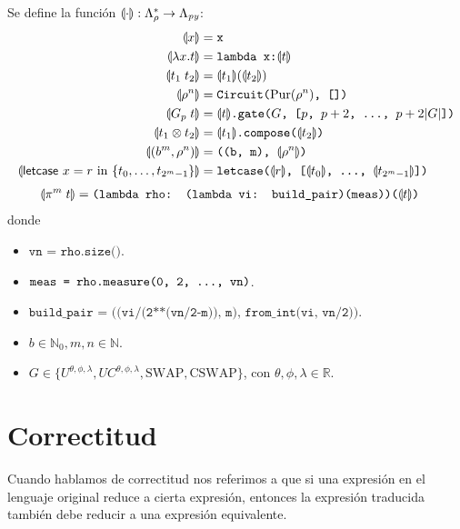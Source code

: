 \begin{definicion}
\label{def:traduccion}$\;$

Se define la función $\llparenthesis \cdot \rrparenthesis : \Lambda_\rho^* \rightarrow \Lambda_\textit{py}$:
\begin{align*}
\llparenthesis x \rrparenthesis &= \texttt{x} \\
\llparenthesis \lambda x.t \rrparenthesis &= \texttt{lambda x:\ensuremath{\llparenthesis t \rrparenthesis}} \\
\llparenthesis t_1\;t_2 \rrparenthesis &= \llparenthesis t_1 \rrparenthesis(\llparenthesis t_2 \rrparenthesis) \\
\llparenthesis \rho^n \rrparenthesis &= \texttt{Circuit(}\text{Pur}(\rho^n)\texttt{, [])} \\
\llparenthesis G_p\;t \rrparenthesis &= \llparenthesis t \rrparenthesis\texttt{.gate(}G\texttt{, [}p\texttt{, }p+2\texttt{, \dots, }p+2|G|\texttt{])} \\
\llparenthesis t_1 \otimes t_2 \rrparenthesis &= \llparenthesis t_1 \rrparenthesis\texttt{.compose(\ensuremath{\llparenthesis t_2 \rrparenthesis})} \\
\llparenthesis (b^m, \rho^n) \rrparenthesis &= \texttt{((b, m), }\llparenthesis \rho^n \rrparenthesis\texttt{)} \\
\llparenthesis \textsf{letcase }x = r \textrm{ in } \{t_0,\dots,t_{2^m-1}\}  \rrparenthesis &= \texttt{letcase(\ensuremath{\llparenthesis r \rrparenthesis}, [\ensuremath{\llparenthesis t_0 \rrparenthesis}, \dots, \ensuremath{\llparenthesis t_{2^m-1} \rrparenthesis}])}
\end{align*}
\vspace{-2\baselineskip}
\begin{align*}
\llparenthesis \pi^m\;t \rrparenthesis &= \texttt{(lambda rho: (lambda vi: build\_pair)(meas))(}\llparenthesis t \rrparenthesis\texttt{)}
\end{align*}
donde
\begin{itemize}
    \item $\texttt{vn = rho.size()}$.
    \item $\texttt{meas = rho.measure(0, 2, \dots, vn)}$.
    \item $\texttt{build\_pair = ((vi/(2**(vn/2-m)), m), from\_int(vi, vn/2))}$.
    \item $b\in \mathbb{N}_0,m,n \in  \mathbb{N}$.
    \item $G \in \{U^{\theta, \phi, \lambda}, UC^{\theta, \phi, \lambda}, \textrm{SWAP}, \textrm{CSWAP}\}$, con $\theta, \phi, \lambda \in \mathbb{R}$.
\end{itemize}
\end{definicion}

\section{Correctitud}

Cuando hablamos de correctitud nos referimos a que si una expresión en el lenguaje original reduce a cierta expresión, entonces la expresión traducida también debe reducir a una expresión equivalente.

